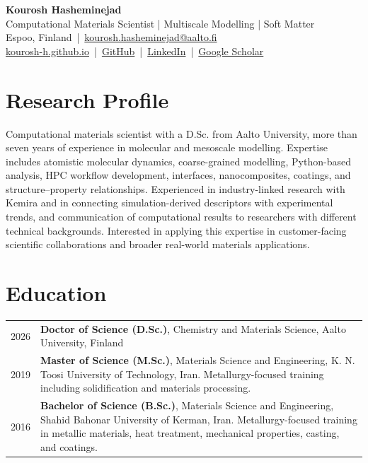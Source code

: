 \documentclass[a4paper,10pt]{article}
\begin{document}
\begin{center}
    {\LARGE \textbf{Kourosh Hasheminejad}}\\[4pt]
    {\large Computational Materials Scientist | Multiscale Modelling | Soft Matter}\\[6pt]
    Espoo, Finland \,|\,
    \href{mailto:kourosh.hasheminejad@aalto.fi}{kourosh.hasheminejad@aalto.fi}\\[2pt]
    \href{https://kourosh-h.github.io}{kourosh-h.github.io} \,|\,
    \href{https://github.com/kourosh-h}{GitHub} \,|\,
    \href{https://fi.linkedin.com/in/kourosh-hasheminejad-2577001aa/}{LinkedIn} \,|\,
    \href{https://scholar.google.com/citations?user=Ey7-XMsAAAAJ&hl=en}{Google Scholar}
\end{center}

\section{Research Profile}
Computational materials scientist with a D.Sc. from Aalto University, more than seven years of experience in molecular and mesoscale modelling. Expertise includes atomistic molecular dynamics, coarse-grained modelling, Python-based analysis, HPC workflow development, interfaces, nanocomposites, coatings, and structure--property relationships. Experienced in industry-linked research with Kemira and in connecting simulation-derived descriptors with experimental trends, and communication of computational results to researchers with different technical backgrounds. Interested in applying this expertise in customer-facing scientific collaborations and broader real-world materials applications.

\section{Education}
\begin{tabularx}{\linewidth}{@{}K Y@{}}
2026 & \textbf{Doctor of Science (D.Sc.)}, Chemistry and Materials Science, Aalto University, Finland \\
2019 & \textbf{Master of Science (M.Sc.)}, Materials Science and Engineering, K. N. Toosi University of Technology, Iran. Metallurgy-focused training including solidification and materials processing. \\
2016 & \textbf{Bachelor of Science (B.Sc.)}, Materials Science and Engineering, Shahid Bahonar University of Kerman, Iran. Metallurgy-focused training in metallic materials, heat treatment, mechanical properties, casting, and coatings. \\
\end{tabularx}
\end{document}

